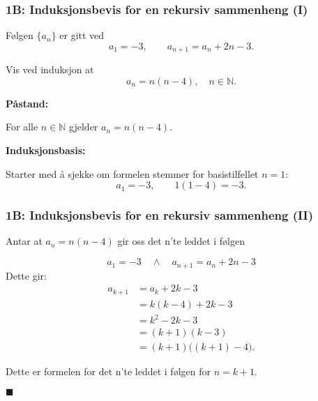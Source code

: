 \greenheader
\begin{frame}
\frametitle{1B: Induksjonsbevis for en rekursiv sammenheng (I)}
Følgen $\{a_n\}$ er gitt ved
\[
a_1=-3, \qquad  a_{n+1}=a_n+2n-3.
\]

Vis ved induksjon at
\[
a_n = n(n-4), \quad n\in\mathbb{N}.
\]

\medskip
\textbf{Påstand:} 

For alle $n\in\mathbb{N}$ gjelder $a_n = n(n-4)$.

\medskip
\textbf{Induksjonsbasis:}


Starter med å sjekke om formelen stemmer for basistilfellet $n=1$:
\[
a_1=-3, \qquad 1(1-4)=-3.
\]


\end{frame}


\greenheader
\begin{frame}
\frametitle{1B: Induksjonsbevis for en rekursiv sammenheng  (II)}


Antar at $a_n = n(n-4)$  gir oss det n'te leddet i følgen 

\[
a_1=-3 \quad \wedge \quad  a_{n+1}=a_n+2n-3
\]
Dette gir:
\begin{align*}
a_{k+1} &= a_k + 2k - 3 \\
        &= k(k-4) + 2k - 3 \\
        &= k^2 - 2k - 3 \\
        &= (k+1)(k-3) \\
        &= (k+1)\bigl((k+1)-4\bigr).
\end{align*}

Dette er formelen for det n'te leddet i følgen for $n=k+1$.

\hfill $\blacksquare$


\end{frame}
